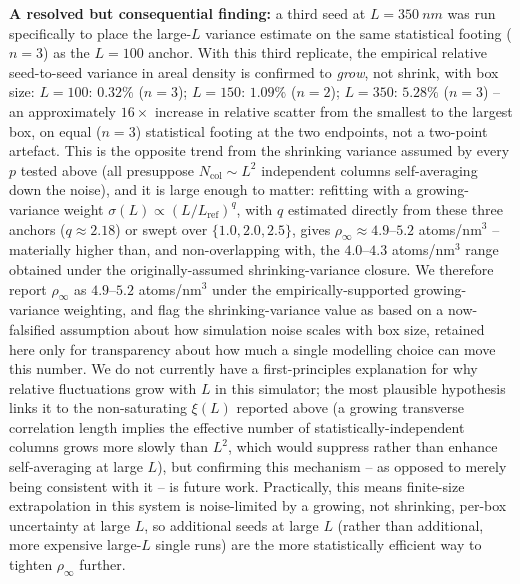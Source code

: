 \documentclass[aip,amsmath,amssymb,reprint]{revtex4-1}
\begin{document}
\textbf{A resolved but consequential finding:} a third seed at
$L=\SI{350}{nm}$ was run specifically to place the large-$L$ variance
estimate on the same statistical footing ($n=3$) as the $L=100$ anchor.
With this third replicate, the empirical relative seed-to-seed variance in
areal density is confirmed to \emph{grow}, not shrink, with box size:
$L=100$: $0.32\%$ ($n=3$); $L=150$: $1.09\%$ ($n=2$); $L=350$: $5.28\%$
($n=3$) -- an approximately $16\times$ increase in relative scatter from
the smallest to the largest box, on equal ($n=3$) statistical footing at
the two endpoints, not a two-point artefact. This is the opposite trend
from the shrinking variance assumed by every $p$ tested above (all
presuppose $N_{\mathrm{col}}\!\sim\!L^2$ independent columns
self-averaging down the noise), and it is large enough to matter: refitting
with a growing-variance weight $\sigma(L)\propto (L/L_{\mathrm{ref}})^{q}$,
with $q$ estimated directly from these three anchors ($q\approx2.18$) or
swept over $\{1.0,2.0,2.5\}$, gives $\rho_\infty \approx 4.9$--$5.2$
atoms/nm$^3$ -- materially higher than, and non-overlapping with, the
$4.0$--$4.3$ atoms/nm$^3$ range obtained under the originally-assumed
shrinking-variance closure. We therefore report $\rho_\infty$ as
$4.9$--$5.2$ atoms/nm$^3$ under the empirically-supported growing-variance
weighting, and flag the shrinking-variance value as based on a
now-falsified assumption about how simulation noise scales with box size,
retained here only for transparency about how much a single modelling
choice can move this number. We do not currently have a first-principles
explanation for why relative fluctuations grow with $L$ in this simulator;
the most plausible hypothesis links it to the non-saturating $\xi(L)$
reported above (a growing transverse correlation length implies the
effective number of statistically-independent columns grows more slowly
than $L^2$, which would suppress rather than enhance self-averaging at
large $L$), but confirming this mechanism -- as opposed to merely being
consistent with it -- is future work. Practically, this means finite-size
extrapolation in this system is noise-limited by a growing, not shrinking,
per-box uncertainty at large $L$, so additional seeds at large $L$ (rather
than additional, more expensive large-$L$ single runs) are the more
statistically efficient way to tighten $\rho_\infty$ further.
\end{document}
